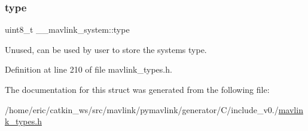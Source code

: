 \subsubsection{\texorpdfstring{type}{type}}
{\footnotesize\ttfamily uint8\+\_\+t \+\_\+\+\_\+mavlink\+\_\+system\+::type}



Unused, can be used by user to store the system\textquotesingle{}s type. 



Definition at line 210 of file mavlink\+\_\+types.\+h.



The documentation for this struct was generated from the following file\+:\begin{DoxyCompactItemize}
\item 
/home/eric/catkin\+\_\+ws/src/mavlink/pymavlink/generator/\+C/include\+\_\+v0./\mbox{\hyperlink{include__v0_89_2mavlink__types_8h}{mavlink\+\_\+types.\+h}}\end{DoxyCompactItemize}
